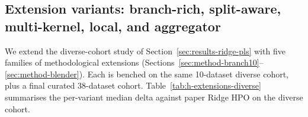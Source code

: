 
\subsection{Extension variants: branch-rich, split-aware, multi-kernel,
            local, and aggregator}\label{sec:results-extensions}

We extend the diverse-cohort study of
Section~\ref{sec:results-ridge-pls} with five families of methodological
extensions (Sections~\ref{sec:method-branch10}--\ref{sec:method-blender}).
Each is benched on the same 10-dataset diverse cohort, plus a final
curated 38-dataset cohort. Table~\ref{tab:h-extensions-diverse} summarises the
per-variant median delta against paper Ridge HPO on the diverse cohort.

